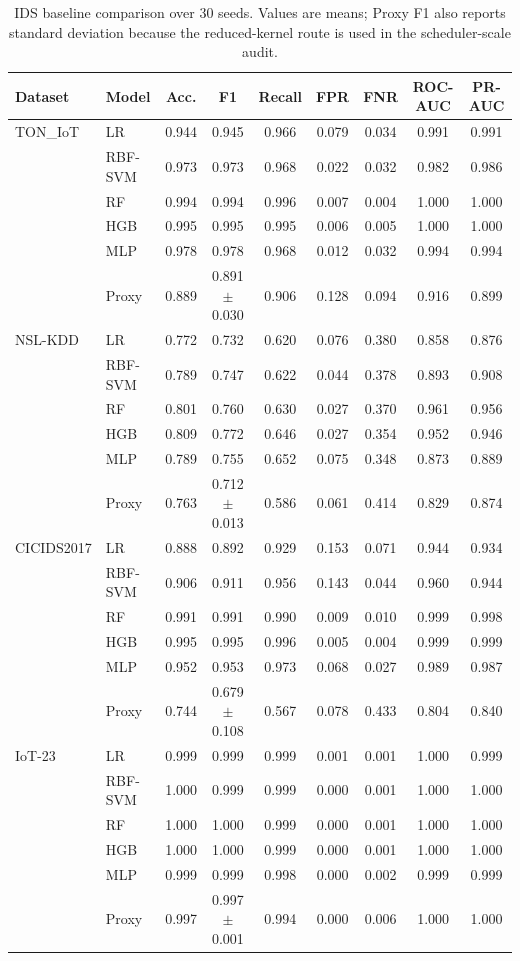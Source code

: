 \documentclass[conference]{IEEEtran}
\begin{document}
\begin{table}[t]
\caption{IDS baseline comparison over 30 seeds. Values are means; Proxy F1 also reports standard deviation because the reduced-kernel route is used in the scheduler-scale audit.}
\label{tab:ids}
\centering
\begingroup
\tiny
\setlength{\tabcolsep}{3.0pt}
\renewcommand{\arraystretch}{0.84}
\begin{tabular}{@{}llccccccc@{}}
\toprule
Dataset & Model & Acc. & F1 & Recall & FPR & FNR & ROC-AUC & PR-AUC \\
\midrule
TON\_IoT & LR & 0.944 & 0.945 & 0.966 & 0.079 & 0.034 & 0.991 & 0.991 \\
 & RBF-SVM & 0.973 & 0.973 & 0.968 & 0.022 & 0.032 & 0.982 & 0.986 \\
 & RF & 0.994 & 0.994 & 0.996 & 0.007 & 0.004 & 1.000 & 1.000 \\
 & HGB & 0.995 & 0.995 & 0.995 & 0.006 & 0.005 & 1.000 & 1.000 \\
 & MLP & 0.978 & 0.978 & 0.968 & 0.012 & 0.032 & 0.994 & 0.994 \\
 & Proxy & 0.889 & 0.891$\pm$0.030 & 0.906 & 0.128 & 0.094 & 0.916 & 0.899 \\
\midrule
NSL-KDD & LR & 0.772 & 0.732 & 0.620 & 0.076 & 0.380 & 0.858 & 0.876 \\
 & RBF-SVM & 0.789 & 0.747 & 0.622 & 0.044 & 0.378 & 0.893 & 0.908 \\
 & RF & 0.801 & 0.760 & 0.630 & 0.027 & 0.370 & 0.961 & 0.956 \\
 & HGB & 0.809 & 0.772 & 0.646 & 0.027 & 0.354 & 0.952 & 0.946 \\
 & MLP & 0.789 & 0.755 & 0.652 & 0.075 & 0.348 & 0.873 & 0.889 \\
 & Proxy & 0.763 & 0.712$\pm$0.013 & 0.586 & 0.061 & 0.414 & 0.829 & 0.874 \\
\midrule
CICIDS2017 & LR & 0.888 & 0.892 & 0.929 & 0.153 & 0.071 & 0.944 & 0.934 \\
 & RBF-SVM & 0.906 & 0.911 & 0.956 & 0.143 & 0.044 & 0.960 & 0.944 \\
 & RF & 0.991 & 0.991 & 0.990 & 0.009 & 0.010 & 0.999 & 0.998 \\
 & HGB & 0.995 & 0.995 & 0.996 & 0.005 & 0.004 & 0.999 & 0.999 \\
 & MLP & 0.952 & 0.953 & 0.973 & 0.068 & 0.027 & 0.989 & 0.987 \\
 & Proxy & 0.744 & 0.679$\pm$0.108 & 0.567 & 0.078 & 0.433 & 0.804 & 0.840 \\
\midrule
IoT-23 & LR & 0.999 & 0.999 & 0.999 & 0.001 & 0.001 & 1.000 & 0.999 \\
 & RBF-SVM & 1.000 & 0.999 & 0.999 & 0.000 & 0.001 & 1.000 & 1.000 \\
 & RF & 1.000 & 1.000 & 0.999 & 0.000 & 0.001 & 1.000 & 1.000 \\
 & HGB & 1.000 & 1.000 & 0.999 & 0.000 & 0.001 & 1.000 & 1.000 \\
 & MLP & 0.999 & 0.999 & 0.998 & 0.000 & 0.002 & 0.999 & 0.999 \\
 & Proxy & 0.997 & 0.997$\pm$0.001 & 0.994 & 0.000 & 0.006 & 1.000 & 1.000 \\
\bottomrule
\end{tabular}
\endgroup
\end{table}
\end{document}
